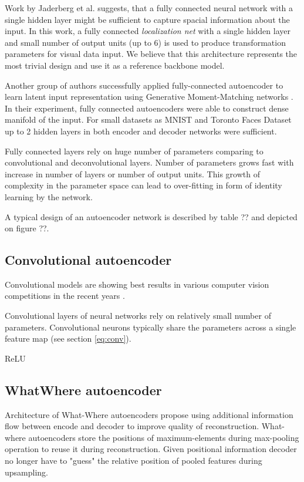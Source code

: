 Work by Jaderberg et al. \cite{Jaderberg2015} suggests, that a fully connected neural network with a single hidden layer might be sufficient to capture spacial information about the input.
In this work, a fully connected \textit{localization net} with a single hidden layer and small number of output units (up to 6) is used to produce transformation parameters for visual data input.
We believe that this architecture represents the most trivial design and use it as a reference backbone model.

Another group of authors successfully applied fully-connected autoencoder to learn latent input representation using Generative Moment-Matching networks \cite{Li2015}. In their experiment, fully connected autoencoders were able to construct dense manifold of the input. For small datasets as MNIST and Toronto Faces Dataset \cite{tfd,lecun-mnisthandwrittendigit-2010} up to 2 hidden layers in both encoder and decoder networks were sufficient.

Fully connected layers rely on huge number of parameters comparing to convolutional and deconvolutional layers.
Number of parameters grows fast with increase in number of layers or number of output units.
This growth of complexity in the parameter space can lead to over-fitting in form of identity learning by the network.

A typical design of an autoencoder network is described by table ?? and depicted on figure ??.

\subsection{Convolutional autoencoder}

Convolutional models are showing best results in various computer vision competitions in the recent years \cite{ILSVRC15, Zhou2016}.

Convolutional layers of neural networks rely on relatively small number of parameters.
Convolutional neurons typically share the parameters across a single feature map (see section \ref{eq:conv}).

ReLU \cite{Nair2010}



\subsection{WhatWhere autoencoder}

Architecture of What-Where autoencoders \cite{Zhao2015} propose using additional information flow between encode and decoder to improve quality of reconstruction.
What-where autoencoders store the positions of maximum-elements during max-pooling operation to reuse it during reconstruction.
Given positional information decoder no longer have to "guess" the relative position of pooled features during upsampling.


